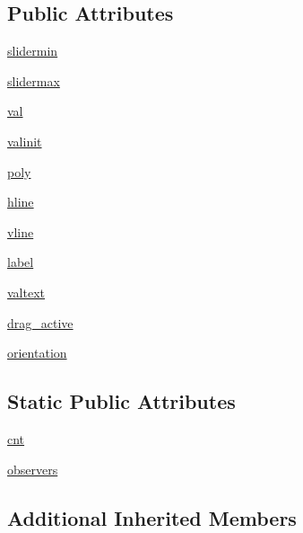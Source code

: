 \subsection*{Public Attributes}
\begin{DoxyCompactItemize}
\item 
\hyperlink{classmatplotlib_1_1widgets_1_1Slider_ad28efb3332972c4795d869a00f6cefb6}{slidermin}
\item 
\hyperlink{classmatplotlib_1_1widgets_1_1Slider_a610835502406cd46236d018cf356df52}{slidermax}
\item 
\hyperlink{classmatplotlib_1_1widgets_1_1Slider_a03fa7217903354cf1594cefab3356c0b}{val}
\item 
\hyperlink{classmatplotlib_1_1widgets_1_1Slider_a23b2a997bac0b7ec921a9a0bea8533f5}{valinit}
\item 
\hyperlink{classmatplotlib_1_1widgets_1_1Slider_a610d142f42675b1390c7ea57522bdb6f}{poly}
\item 
\hyperlink{classmatplotlib_1_1widgets_1_1Slider_ab3502e3d14f69115acecb84aa42bf64d}{hline}
\item 
\hyperlink{classmatplotlib_1_1widgets_1_1Slider_a07f8886d18b09936b5be9436b6c1d2ae}{vline}
\item 
\hyperlink{classmatplotlib_1_1widgets_1_1Slider_abaed3f1daf09b27b549afd2328772af7}{label}
\item 
\hyperlink{classmatplotlib_1_1widgets_1_1Slider_ac7f44cd54cb72b0292ddd95b974c2b78}{valtext}
\item 
\hyperlink{classmatplotlib_1_1widgets_1_1Slider_ac17cc14ed23f1dab39e20e9766035805}{drag\+\_\+active}
\item 
\hyperlink{classmatplotlib_1_1widgets_1_1Slider_aacffa1c60ba374d9a8b807b6e268f87a}{orientation}
\end{DoxyCompactItemize}
\subsection*{Static Public Attributes}
\begin{DoxyCompactItemize}
\item 
\hyperlink{classmatplotlib_1_1widgets_1_1Slider_a2d53683bfa871b02db2d34bb040ce4c9}{cnt}
\item 
\hyperlink{classmatplotlib_1_1widgets_1_1Slider_add79eefcf9fd14be67a9068067fac75b}{observers}
\end{DoxyCompactItemize}
\subsection*{Additional Inherited Members}


